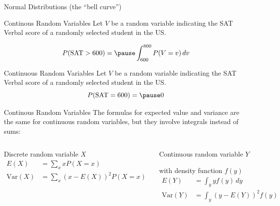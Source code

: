 \documentclass{beamer}\usepackage[]{graphicx}\usepackage[]{color}
\newenvironment{knitrout}{}{} %
\begin{document}
\begin{darkframes}
\begin{frame}{Normal Distributions (the ``bell curve'')}
\lc
\end{frame}

\begin{frame}{Continous Random Variables}
Let $V$ be a random variable indicating the SAT Verbal score of a randomly selected student in the US.

\[
  P(\text{SAT} > 600) = \pause \int_{600}^{800} P(V = v) \, dv
\]

\pause

\begin{knitrout}


\end{knitrout}
\end{frame}

\begin{frame}{Continuous Random Variables}
Let $V$ be a random variable indicating the SAT Verbal score of a randomly selected student in the US.
\[
  P(\text{SAT} = 600) = \pause 0
\]
\begin{knitrout}


\end{knitrout}
\end{frame}


\begin{frame}{Continous Random Variables}
The formulas for expected value and variance are the same for continuous random variables, but they involve integrals instead of sums:

\begin{columns}[T,onlytextwidth]
    \begin{center}
  	Discrete random variable $X$
    \\

  	\begin{align*}
      E(X) &= \sum_x x  P(X=x) \\
      \text{Var}(X) &= \sum_x (x-E(X))^2 P(X=x)
    \end{align*}
    \end{center}

    \begin{center}
  	Continuous random variable $Y$

    with density function $f(y)$
  	\begin{align*}
	    E(Y) &= \int_y y f(y) \, dy \\
      \text{Var}(Y) &= \int_y (y-E(Y))^2 f(y)
    \end{align*}
    \end{center}
\end{columns}
\lc
\end{frame}



\end{darkframes}
\end{document}
